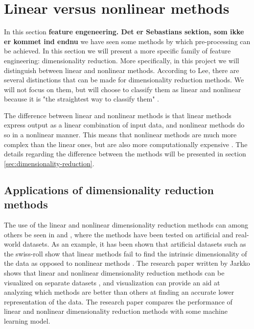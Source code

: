 \section{Linear versus nonlinear methods}\label{sec:linear-vs-nonlinear}

In this section \textbf{feature engeneering. Det er Sebastians sektion, som ikke er kommet ind endnu} we have seen some methods by which pre-processing can be achieved. In this section we will present a more specific family of feature engineering: dimensionality reduction. More specifically, in this project we will distinguish between linear and nonlinear methods. According to Lee, there are several distinctions that can be made for dimensionality reduction methods. We will not focus on them, but will choose to classify them as linear and nonlinear because it is "the straightest way to classify them" \cite{nonlinear-dim-red-chapter-two}.


The difference between linear and nonlinear methods is that linear methods express output as a linear combination of input data, and nonlinear methods do so in a nonlinear manner. This means that nonlinear methods are much more complex than the linear ones, but are also more computationally expensive \cite{nonlinear-dim-red-chapter-two}. The details regarding the difference between the methods will be presented in section \ref{sec:dimensionality-reduction}.

\subsection{Applications of dimensionality reduction methods}
The use of the linear and nonlinear dimensionality reduction methods can among others be seen in \cite{dimensionality-reduction-comparative-review} and \cite{tennenbaum}, where the methods have been tested on artificial and real-world datasets. As an example, it has been shown that artificial datasets such as the swiss-roll show that linear methods fail to find the intrinsic dimensionality of the data as opposed to nonlinear methods \cite{tennenbaum}. The research paper written by Jarkko shows that linear and nonlinear dimensionality reduction methods can be visualized on separate datasets \cite{dim-red-visual}, and visualization can provide an aid at analyzing which methods are better than others at finding an accurate lower representation of the data. The research paper \cite{dimensionality-reduction-comparative-review} compares the performance of linear and nonlinear dimensionality reduction methods with some machine learning model.


